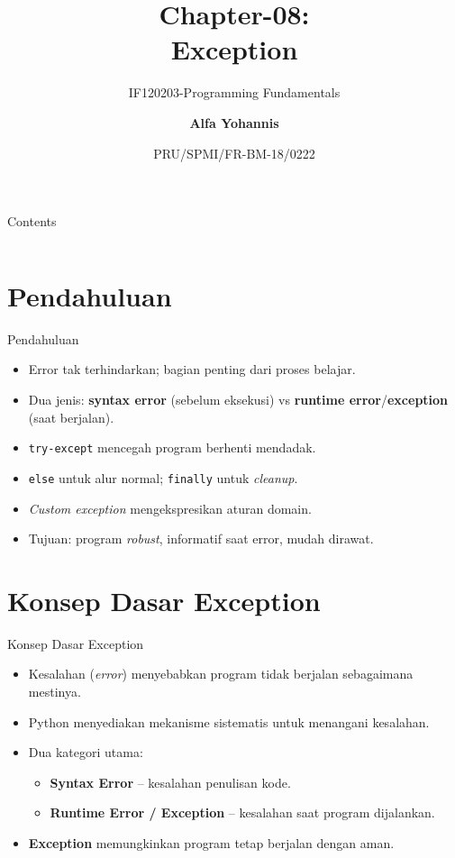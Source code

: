 \documentclass[aspectratio=169, table]{beamer}
\subtitle{IF120203-Programming Fundamentals}
\title{Chapter-08:\\\LARGE{Exception\\}
\vspace{10pt}}
\date[Serial]{\scriptsize {PRU/SPMI/FR-BM-18/0222}}
\author[Pradita]{\small{\textbf{Alfa Yohannis}}}
\begin{document}
\frame{\titlepage}

\begin{frame}[fragile]{Contents}
\vspace{15pt}
\begin{columns}[t]
\begin{column}{.4\textwidth}
\tableofcontents[sections={1-4}]
\end{column}
\begin{column}{.6\textwidth}
\tableofcontents[sections={5-7}]
\end{column}
\end{columns}
\end{frame}


\section{Pendahuluan}
\begin{frame}[fragile]{Pendahuluan}
\vspace*{20pt}
\begin{itemize}
  \item Error tak terhindarkan; bagian penting dari proses belajar.
  \item Dua jenis: \textbf{syntax error} (sebelum eksekusi) vs \textbf{runtime error}/\textbf{exception} (saat berjalan).
  \item \texttt{try-except} mencegah program berhenti mendadak.
  \item \texttt{else} untuk alur normal; \texttt{finally} untuk \emph{cleanup}.
  \item \emph{Custom exception} mengekspresikan aturan domain.
  \item Tujuan: program \emph{robust}, informatif saat error, mudah dirawat.
\end{itemize}
\end{frame}

\section{Konsep Dasar Exception}

\begin{frame}[fragile]{Konsep Dasar Exception}
\vspace*{20pt}
\begin{itemize}
  \item Kesalahan (\textit{error}) menyebabkan program tidak berjalan sebagaimana mestinya.
  \item Python menyediakan mekanisme sistematis untuk menangani kesalahan.
  \item Dua kategori utama:
    \begin{itemize}
        \item \textbf{Syntax Error} – kesalahan penulisan kode.
        \item \textbf{Runtime Error / Exception} – kesalahan saat program dijalankan.
    \end{itemize}
  \item \textbf{Exception} memungkinkan program tetap berjalan dengan aman.
\end{itemize}
\end{frame}
\end{document}
